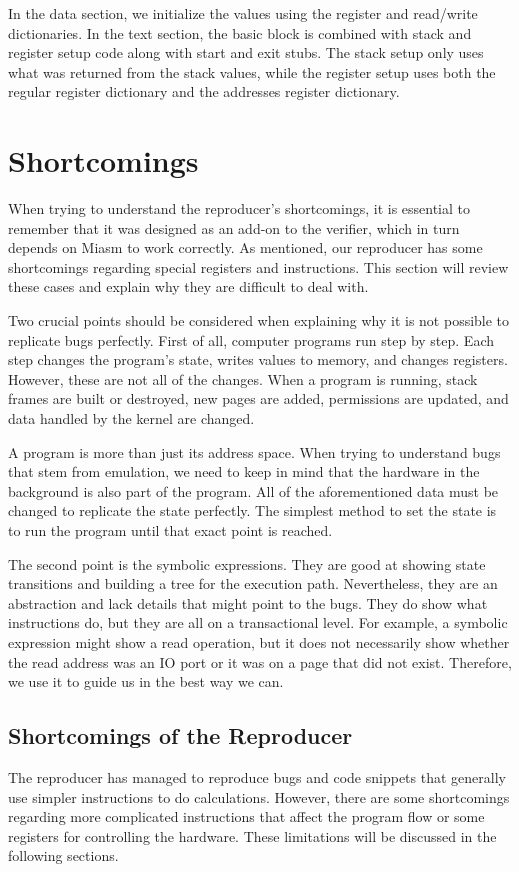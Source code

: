 In the data section, we initialize the values using the register and read/write dictionaries.
In the text section, the basic block is combined with stack and register setup code along with start and exit stubs.
The stack setup only uses what was returned from the stack values, while the register setup uses both the regular register dictionary and the addresses register dictionary.

\section{Shortcomings}
When trying to understand the reproducer's shortcomings, it is essential to remember that it was designed as an add-on to the verifier, which in turn depends on Miasm to work correctly.
As mentioned, our reproducer has some shortcomings regarding special registers and instructions.
This section will review these cases and explain why they are difficult to deal with.

Two crucial points should be considered when explaining why it is not possible to replicate bugs perfectly.
First of all, computer programs run step by step.
Each step changes the program's state, writes values to memory, and changes registers.
However, these are not all of the changes.
When a program is running, stack frames are built or destroyed, new pages are added, permissions are updated, and data handled by the kernel are changed.

A program is more than just its address space.
When trying to understand bugs that stem from emulation, we need to keep in mind that the hardware in the background is also part of the program.
All of the aforementioned data must be changed to replicate the state perfectly.
The simplest method to set the state is to run the program until that exact point is reached.


The second point is the symbolic expressions.
They are good at showing state transitions and building a tree for the execution path.
Nevertheless, they are an abstraction and lack details that might point to the bugs.
They do show what instructions do, but they are all on a transactional level.
For example, a symbolic expression might show a read operation, but it does not necessarily show whether the read address was an IO port or it was on a page that did not exist.
Therefore, we use it to guide us in the best way we can.

\subsection{Shortcomings of the Reproducer}
The reproducer has managed to reproduce bugs and code snippets that generally use simpler instructions to do calculations.
However, there are some shortcomings regarding more complicated instructions that affect the program flow or some registers for controlling the hardware.
These limitations will be discussed in the following sections.

